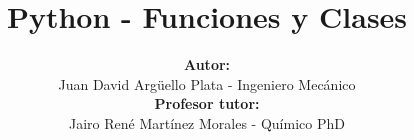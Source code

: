 \documentclass[20]{beamer}
\title[ACMA]{\textbf{Python - Funciones y Clases}}
\author[Juan David]{
\textbf{Autor:}\\
Juan David Argüello Plata - Ingeniero Mecánico\\
\vspace{5pt}
\textbf{Profesor tutor:}\\
Jairo René Martínez Morales - Químico PhD
}
\institute[]{
	CENIVAM\\
	Universidad Industrial de Santander
}
\date{}
\begin{document}
\begin{frame}
\titlepage
\end{frame}










\end{document}
